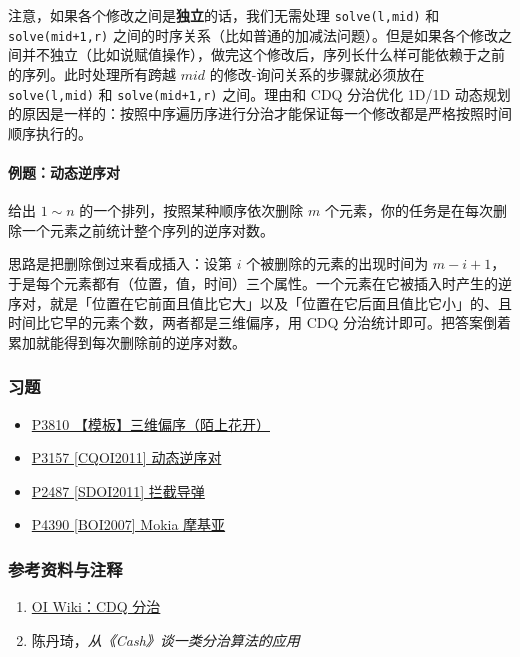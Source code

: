 注意，如果各个修改之间是\textbf{独立}的话，我们无需处理 \texttt{solve(l,mid)} 和 \texttt{solve(mid+1,r)} 之间的时序关系（比如普通的加减法问题）。但是如果各个修改之间并不独立（比如说赋值操作），做完这个修改后，序列长什么样可能依赖于之前的序列。此时处理所有跨越 $mid$ 的修改-询问关系的步骤就必须放在 \texttt{solve(l,mid)} 和 \texttt{solve(mid+1,r)} 之间。理由和 CDQ 分治优化 1D/1D 动态规划的原因是一样的：按照中序遍历序进行分治才能保证每一个修改都是严格按照时间顺序执行的。

\paragraph{例题：动态逆序对}
给出 $1 \sim n$ 的一个排列，按照某种顺序依次删除 $m$ 个元素，你的任务是在每次删除一个元素之前统计整个序列的逆序对数。

思路是把删除倒过来看成插入：设第 $i$ 个被删除的元素的出现时间为 $m-i+1$，于是每个元素都有（位置，值，时间）三个属性。一个元素在它被插入时产生的逆序对，就是「位置在它前面且值比它大」以及「位置在它后面且值比它小」的、且时间比它早的元素个数，两者都是三维偏序，用 CDQ 分治统计即可。把答案倒着累加就能得到每次删除前的逆序对数。

\hrulefill

\subsubsection*{习题}

\begin{itemize}
    \item \href{https://www.luogu.com.cn/problem/P3810}{P3810 【模板】三维偏序（陌上花开）}
    \item \href{https://www.luogu.com.cn/problem/P3157}{P3157 [CQOI2011] 动态逆序对}
    \item \href{https://www.luogu.com.cn/problem/P2487}{P2487 [SDOI2011] 拦截导弹}
    \item \href{https://www.luogu.com.cn/problem/P4390}{P4390 [BOI2007] Mokia 摩基亚}
\end{itemize}

\hrulefill

\subsubsection*{参考资料与注释}

\begin{enumerate}
    \item \href{https://oi-wiki.org/misc/cdq-divide/}{OI Wiki：CDQ 分治}
    \item 陈丹琦，\textit{从《Cash》谈一类分治算法的应用}
\end{enumerate}

